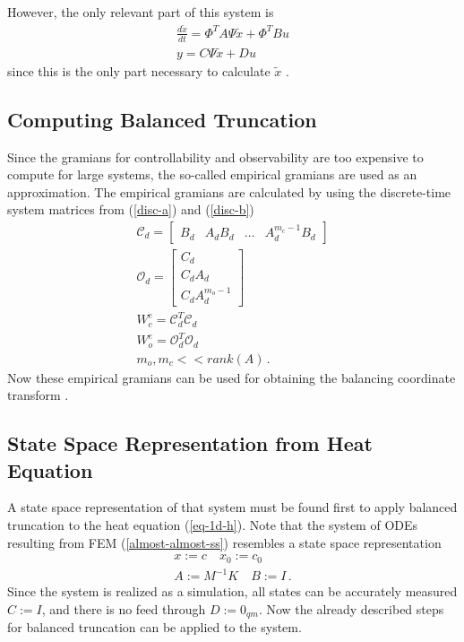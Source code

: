 However, the only relevant part of this system is
\begin{gather}
\frac{d\tilde{x}}{dt} = \Phi^{T}A\Psi\tilde{x} + \Phi^{T}Bu \\
y = C\Psi\tilde{x} + Du  
\end{gather}
since this is the only part necessary to calculate \(\tilde{x}\)
\cite{brunton_kutz_2019e}.

\subsection{Computing Balanced Truncation}
Since the gramians for controllability and observability are too expensive to compute for large systems, the so-called empirical gramians are used as an approximation.
The empirical gramians are calculated by using the discrete-time system matrices from (\ref{disc-a}) and (\ref{disc-b})
\begin{gather}
\mathscr{C}_d = \begin{bmatrix}B_d & A_dB_d & \hdots & A_d^{m_c -1}B_d\end{bmatrix} \\
\mathscr{O}_d = \begin{bmatrix}
C_d \\
C_dA_d \\
C_dA_d^{m_o - 1}
\end{bmatrix} \\
W_c^e = \mathscr{C}_d^{T}\mathscr{C}_d \\
W_o^e = \mathscr{O}_d^{T}\mathscr{O}_d \\
m_o, m_c << rank(A)  \,.
\end{gather}
Now these empirical gramians can be used for obtaining the balancing coordinate transform \cite{brunton_kutz_2019e}.

\subsection{State Space Representation from Heat Equation} \label{heat-ss}
A state space representation of that system must be found first to apply balanced truncation to the heat equation (\ref{eq-1d-h}).
Note that the system of ODEs resulting from FEM (\ref{almost-almost-ss}) resembles a state space representation
\begin{gather}
x := c \quad x_0 := c_0 \\
A := M^{-1}K \quad B:= I  \,.
\end{gather}
Since the system is realized as a simulation, all states can be accurately measured \(C := I\), and there is no feed through \(D := 0_{qm}\).
Now the already described steps for balanced truncation can be applied to the system.

